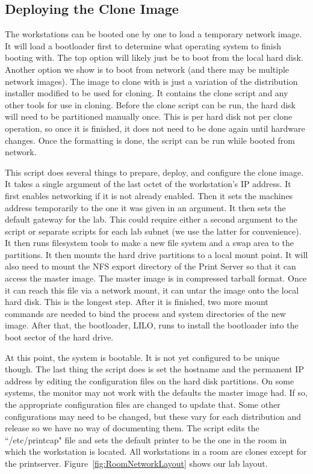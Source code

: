 \subsection{Deploying the Clone Image}
The workstations can be booted one by one to load a temporary network image.  It will load a bootloader first to determine what operating system to finish booting with.  The top option will likely just be to boot from the local hard disk.  Another option we show is to boot from network (and there may be multiple network images).  The image to clone with is just a variation of the distribution installer modified to be used for cloning.  It contains the clone script and any other tools for use in cloning.  Before the clone script can be run, the hard disk will need to be partitioned manually once.  This is per hard disk not per clone operation, so once it is finished, it does not need to be done again until hardware changes.  Once the formatting is done, the script can be run while booted from network.

This script does several things to prepare, deploy, and configure the clone image.  It takes a single argument of the last octet of the workstation's IP address.  It first enables networking if it is not already enabled.  Then it sets the machines address temporarily to the one it was given in an argument.  It then sets the default gateway for the lab.  This could require either a second argument to the script or separate scripts for each lab subnet (we use the latter for convenience).  It then runs filesystem tools to make a new file system and a swap area to the partitions.  It then mounts the hard drive partitions to a local mount point.  It will also need to mount the NFS export directory of the Print Server so that it can access the master image.  The master image is in compressed tarball format.  Once it can reach this file via a network mount, it can untar the image onto the local hard disk.  This is the longest step.  After it is finished, two more mount commands are needed to bind the process and system directories of the new image.  After that, the bootloader, LILO, runs to install the bootloader into the boot sector of the hard drive. 

At this point, the system is bootable.  It is not yet configured to be unique though.  The last thing the script does is set the hostname and the permanent IP address by editing the configuration files on the hard disk partitions.  On some systems, the monitor may not work with the defaults the master image had.  If so, the appropriate configuration files are changed to update that.  Some other configurations may need to be changed, but these vary for each distribution and release so we have no way of documenting them.  The script edits the ``/etc/printcap" file and sets the default printer to be the one in the room in which the workstation is located.  All workstations in a room are clones except for the printserver.  Figure~\ref{fig:RoomNetworkLayout} shows our lab layout. 

